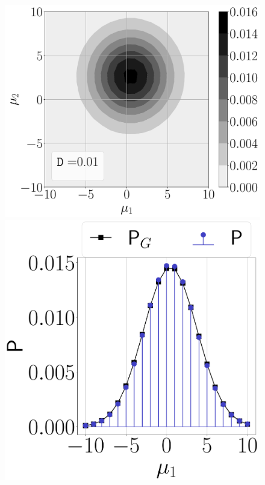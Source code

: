 \begin{figure}
    \centering
    \begin{minipage}[c]{.75\linewidth}
\includegraphics[width=\linewidth]{pics/double-homodyne/full.pdf}
\subcaption[]{}
        \end{minipage}
\hfill
        \begin{minipage}[c]{.45\linewidth}
 \includegraphics[width=\linewidth]{pics/double-homodyne/dm1.pdf}

\end{minipage}
\end{figure}
